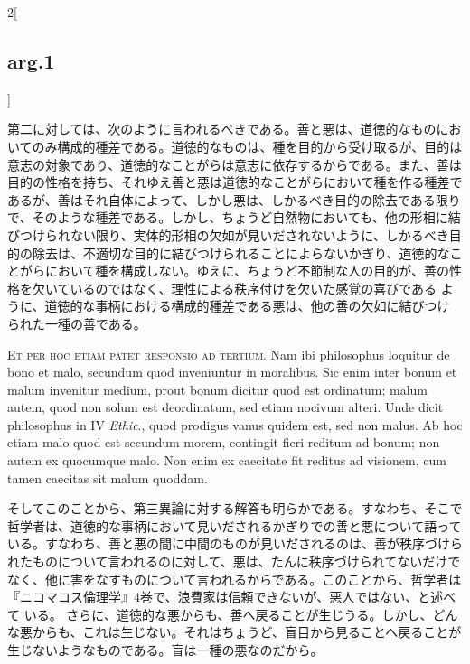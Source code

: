 \documentclass[paper=a4paper,fontsize=10pt,jafontsize=9pt,titlepage]{jlreq}
\begin{document}
\begin{paracol}{2}[\subsection{arg.1}]
\switchcolumn

第二に対しては、次のように言われるべきである。善と悪は、道徳的なものにお
いてのみ構成的種差である。道徳的なものは、種を目的から受け取るが、目的は
意志の対象であり、道徳的なことがらは意志に依存するからである。また、善は
目的の性格を持ち、それゆえ善と悪は道徳的なことがらにおいて種を作る種差で
あるが、善はそれ自体によって、しかし悪は、しかるべき目的の除去である限り
で、そのような種差である。しかし、ちょうど自然物においても、他の形相に結
びつけられない限り、実体的形相の欠如が見いだされないように、しかるべき目
的の除去は、不適切な目的に結びつけられることによらないかぎり、道徳的なこ
とがらにおいて種を構成しない。ゆえに、ちょうど不節制な人の目的が、善の性
格を欠いているのではなく、理性による秩序付けを欠いた感覚の喜びである
ように、道徳的な事柄における構成的種差である悪は、他の善の欠如に結びつけ
られた一種の善である。

\switchcolumn*[\subsection{ad.3}]

{\scshape Et per hoc etiam patet responsio ad tertium}. Nam ibi
philosophus loquitur de bono et malo, secundum quod inveniuntur in
moralibus. Sic enim inter bonum et malum invenitur medium, prout bonum
dicitur quod est ordinatum; malum autem, quod non solum est deordinatum,
sed etiam nocivum alteri. Unde dicit philosophus in IV {\itshape Ethic}., quod
prodigus vanus quidem est, sed non malus. Ab hoc etiam malo quod est
secundum morem, contingit fieri reditum ad bonum; non autem ex quocumque
malo. Non enim ex caecitate fit reditus ad visionem, cum tamen caecitas
sit malum quoddam.

\switchcolumn

そしてこのことから、第三異論に対する解答も明らかである。すなわち、そこで
哲学者は、道徳的な事柄において見いだされるかぎりでの善と悪について語って
いる。すなわち、善と悪の間に中間のものが見いだされるのは、善が秩序づけら
れたものについて言われるのに対して、悪は、たんに秩序づけられてないだけで
なく、他に害をなすものについて言われるからである。このことから、哲学者は
『ニコマコス倫理学』4巻で、浪費家は信頼できないが、悪人ではない、と述べて
いる。
さらに、道徳的な悪からも、善へ戻ることが生じうる。しかし、どんな悪からも、これは生じない。それはちょうど、盲目から見ることへ戻ることが生じないようなものである。盲は一種の悪なのだから。

\switchcolumn*[\subsection{ad.4}]


\end{paracol}
\end{document}
